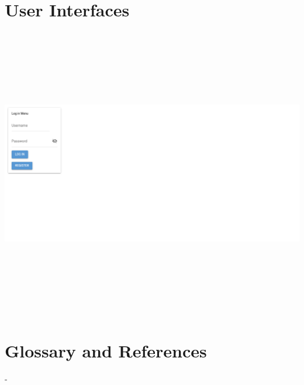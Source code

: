 \documentclass[a4paper,12pt]{report}
\begin{document}
	\section{User Interfaces}
		\includegraphics[width=780pt,height=360pt]{user_interface1.png} %
	\section{Glossary and References}
		-
\end{document}

